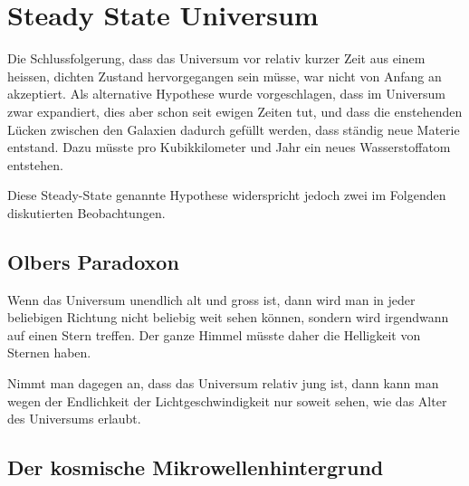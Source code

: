 \section{Steady State Universum}
Die Schlussfolgerung, dass das Universum vor relativ kurzer Zeit
aus einem heissen, dichten 
Zustand hervorgegangen sein müsse, war nicht von Anfang an akzeptiert.
Als alternative Hypothese wurde vorgeschlagen, dass im Universum 
zwar expandiert, dies aber schon seit ewigen Zeiten tut, und dass die
enstehenden
Lücken zwischen den Galaxien dadurch gefüllt werden, dass ständig
neue Materie entstand.
Dazu müsste pro Kubikkilometer und Jahr ein neues Wasserstoffatom
entstehen.

Diese Steady-State genannte Hypothese widerspricht jedoch zwei
im Folgenden diskutierten Beobachtungen.

\subsection{Olbers Paradoxon}
Wenn das Universum unendlich alt und gross ist, dann wird man in jeder
beliebigen Richtung nicht beliebig weit sehen können, sondern wird
irgendwann auf einen Stern treffen.
Der ganze Himmel müsste daher die Helligkeit von Sternen haben.

Nimmt man dagegen an, dass das Universum relativ jung ist, dann kann
man wegen der Endlichkeit der Lichtgeschwindigkeit nur soweit sehen,
wie das Alter des Universums erlaubt.

\subsection{Der kosmische Mikrowellenhintergrund}





